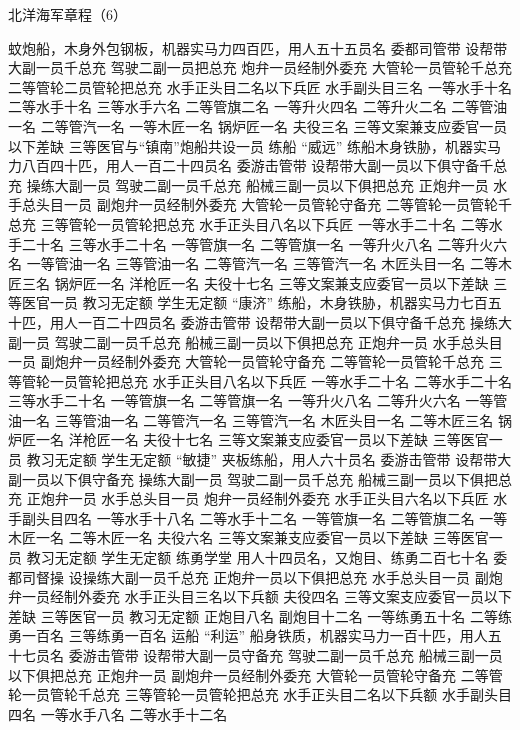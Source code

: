 \documentclass[12pt,UTF8]{ctexbook}
\begin{document}
北洋海军章程（6）

蚊炮船，木身外包钢板，机器实马力四百匹，用人五十五员名
委都司管带
设帮带大副一员千总充
驾驶二副一员把总充
炮弁一员经制外委充
大管轮一员管轮千总充
二等管轮二员管轮把总充
水手正头目二名以下兵匠
水手副头目三名
一等水手十名
二等水手十名
三等水手六名
二等管旗二名
一等升火四名
二等升火二名
二等管油一名
二等管汽一名
一等木匠一名
锅炉匠一名
夫役三名
三等文案兼支应委官一员以下差缺
三等医官与“镇南”炮船共设一员
练船
“威远”
练船木身铁胁，机器实马力八百四十匹，用人一百二十四员名
委游击管带
设帮带大副一员以下俱守备千总充
操练大副一员
驾驶二副一员千总充
船械三副一员以下俱把总充
正炮弁一员
水手总头目一员
副炮弁一员经制外委充
大管轮一员管轮守备充
二等管轮一员管轮千总充
三等管轮一员管轮把总充
水手正头目八名以下兵匠
一等水手二十名
二等水手二十名
三等水手二十名
一等管旗一名
二等管旗一名
一等升火八名
二等升火六名
一等管油一名
三等管油一名
二等管汽一名
三等管汽一名
木匠头目一名
二等木匠三名
锅炉匠一名
洋枪匠一名
夫役十七名
三等文案兼支应委官一员以下差缺
三等医官一员
教习无定额
学生无定额
“康济”
练船，木身铁胁，机器实马力七百五十匹，用人一百二十四员名
委游击管带
设帮带大副一员以下俱守备千总充
操练大副一员
驾驶二副一员千总充
船械三副一员以下俱把总充
正炮弁一员
水手总头目一员
副炮弁一员经制外委充
大管轮一员管轮守备充
二等管轮一员管轮千总充
三等管轮一员管轮把总充
水手正头目八名以下兵匠
一等水手二十名
二等水手二十名
三等水手二十名
一等管旗一名
二等管旗一名
一等升火八名
二等升火六名
一等管油一名
三等管油一名
二等管汽一名
三等管汽一名
木匠头目一名
二等木匠三名
锅炉匠一名
洋枪匠一名
夫役十七名
三等文案兼支应委官一员以下差缺
三等医官一员
教习无定额
学生无定额
“敏捷”
夹板练船，用人六十员名
委游击管带
设帮带大副一员以下俱守备充
操练大副一员
驾驶二副一员千总充
船械三副一员以下俱把总充
正炮弁一员
水手总头目一员
炮弁一员经制外委充
水手正头目六名以下兵匠
水手副头目四名
一等水手十八名
二等水手十二名
一等管旗一名
二等管旗二名
一等木匠一名
二等木匠一名
夫役六名
三等文案兼支应委官一员以下差缺
三等医官一员
教习无定额
学生无定额
练勇学堂
用人十四员名，又炮目、练勇二百七十名
委都司督操
设操练大副一员千总充
正炮弁一员以下俱把总充
水手总头目一员
副炮弁一员经制外委充
水手正头目三名以下兵额
夫役四名
三等文案支应委官一员以下差缺
三等医官一员
教习无定额
正炮目八名
副炮目十二名
一等练勇五十名
二等练勇一百名
三等练勇一百名
运船
“利运”
船身铁质，机器实马力一百十匹，用人五十七员名
委游击管带
设帮带大副一员守备充
驾驶二副一员千总充
船械三副一员以下俱把总充
正炮弁一员
副炮弁一员经制外委充
大管轮一员管轮守备充
二等管轮一员管轮千总充
三等管轮一员管轮把总充
水手正头目二名以下兵额
水手副头目四名
一等水手八名
二等水手十二名
\end{document}
